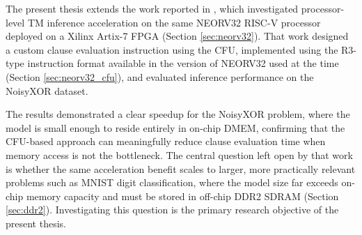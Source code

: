 The present thesis extends the work reported in \cite{JB2025}, which investigated processor-level TM inference acceleration on the same NEORV32 RISC-V processor deployed on a Xilinx Artix-7 FPGA (Section \ref{sec:neorv32}). That work designed a custom clause evaluation instruction using the CFU, implemented using the R3-type instruction format available in the version of NEORV32 used at the time (Section \ref{sec:neorv32_cfu}), and evaluated inference performance on the NoisyXOR dataset.

The results demonstrated a clear speedup for the NoisyXOR problem, where the model is small enough to reside entirely in on-chip DMEM, confirming that the CFU-based approach can meaningfully reduce clause evaluation time when memory access is not the bottleneck. The central question left open by that work is whether the same acceleration benefit scales to larger, more practically relevant problems such as MNIST digit classification, where the model size far exceeds on-chip memory capacity and must be stored in off-chip DDR2 SDRAM (Section \ref{sec:ddr2}). Investigating this question is the primary research objective of the present thesis.
